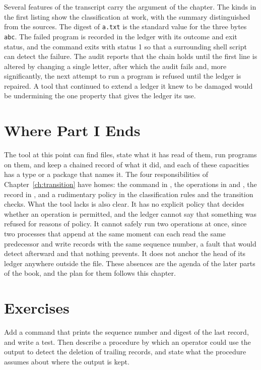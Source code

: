 Several features of the transcript carry the argument of the chapter. The kinds in the first listing show the classification at work, with the summary distinguished from the sources. The digest of \texttt{a.txt} is the standard value for the three bytes \texttt{abc}. The failed program is recorded in the ledger with its outcome and exit status, and the command exits with status 1 so that a surrounding shell script can detect the failure. The audit reports that the chain holds until the first line is altered by changing a single letter, after which the audit fails and, more significantly, the next attempt to run a program is refused until the ledger is repaired. A tool that continued to extend a ledger it knew to be damaged would be undermining the one property that gives the ledger its use.

\section{Where Part I Ends}

The tool at this point can find files, state what it has read of them, run programs on them, and keep a chained record of what it did, and each of these capacities has a type or a package that names it. The four responsibilities of Chapter~\ref{ch:transition} have homes: the command in , the operations in  and , the record in , and a rudimentary policy in the classification rules and the transition checks. What the tool lacks is also clear. It has no explicit policy that decides whether an operation is permitted, and the ledger cannot say that something was refused for reasons of policy. It cannot safely run two operations at once, since two processes that append at the same moment can each read the same predecessor and write records with the same sequence number, a fault that  would detect afterward and that nothing prevents. It does not anchor the head of its ledger anywhere outside the file. These absences are the agenda of the later parts of the book, and the plan for them follows this chapter.

\section*{Exercises}

\begin{exercise}
Add a command  that prints the sequence number and digest of the last record, and write a test. Then describe a procedure by which an operator could use the output to detect the deletion of trailing records, and state what the procedure assumes about where the output is kept.
\end{exercise}

